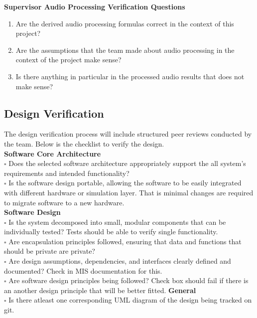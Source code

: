 \documentclass[12pt, titlepage]{article}
\begin{document}
\textbf{Supervisor Audio Processing Verification Questions}
\label{questions:supervisor}
\begin{enumerate}
  \item Are the derived audio processing formulas correct in the context of this
    project?

  \item Are the assumptions that the team made about audio processing in the
    context of the project make sense?
  \item Is there anything in particular in the processed audio results that does
     not make sense?
  \end{enumerate}

\subsection{Design Verification}\label{sec:design_verification}

The design verification process will include structured peer reviews conducted
by the team. Below is the checklist to verify the design.\\
\newline
\textbf{Software Core Architecture} \\
$\square$ Does the selected software architecture appropriately support the all
system's requirements and intended functionality? \\
$\square$ Is the software design portable, allowing the software to be easily
integrated with different hardware or simulation layer. That is minimal changes
are required to migrate software to a new hardware. \\
\newline
\newline
\textbf{Software Design} \\
$\square$ Is the system decomposed into small, modular components that can be
individually tested? Tests should be able to verify single functionality. \\
$\square$ Are encapsulation principles followed, ensuring that data and
functions that should be private are private? \\
$\square$ Are design assumptions, dependencies, and interfaces clearly defined
and documented? Check in MIS documentation \cite{MIS} for this. \\
$\square$ Are software design principles being followed? Check box should fail
if there is an another design principle that will be better fitted.
\newline
\newline
\textbf{General} \\
$\square$ Is there atleast one corresponding UML diagram of the design being
tracked on git. \\
\end{document}
